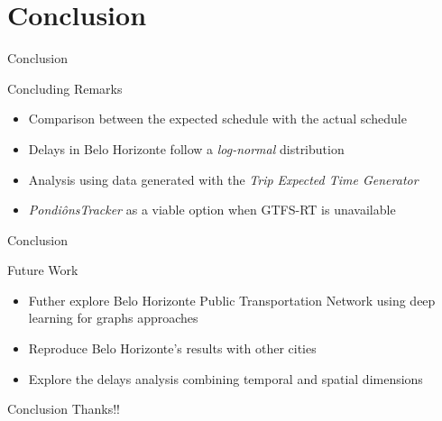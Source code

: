 \documentclass[xcolor=dvipsnames,table]{beamer}
\begin{document}
\section{Conclusion}
\begin{frame}{Conclusion}
        \begin{block}{Concluding Remarks}
                \begin{itemize}
                        \item Comparison between the expected schedule with the actual schedule
                        \item Delays in Belo Horizonte follow a {\em log-normal} distribution
                        \item Analysis using data generated with the \textit{Trip Expected Time Generator}
                        \item \textit{PondiônsTracker} as a viable option when GTFS-RT is unavailable
                \end{itemize}

        \end{block}
\end{frame}
\begin{frame}{Conclusion}
        \begin{block}{Future Work}
                \begin{itemize}
                        \item Futher explore Belo Horizonte Public Transportation Network using deep learning for graphs approaches 
                        \item Reproduce Belo Horizonte's results with other cities
                        \item Explore the delays analysis combining temporal and spatial dimensions
                \end{itemize}

        \end{block}
\end{frame}



\begin{frame}{Conclusion}
        Thanks!!
\end{frame}
\end{document}
